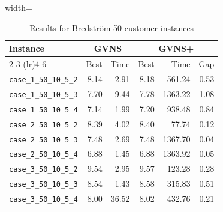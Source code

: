 \documentclass{article}
\begin{document}
\begin{table}[ht]
\centering
\small
\setlength{\tabcolsep}{3pt}
\caption{Results for Bredström 50-customer instances}
\vspace{4mm}
\begin{adjustbox}{width=\textwidth}
\begin{tabular}{l r r @{\hspace{4pt}} r r r}
\toprule
\multirow{2}{*}{Instance} & \multicolumn{2}{c}{GVNS} & \multicolumn{3}{c}{GVNS+} \\
\cmidrule(lr){2-3} \cmidrule(lr){4-6}
 & Best & Time & Best & Time & Gap \\
\midrule
\texttt{case\_1\_50\_10\_5\_2} & 8.14 & 2.91 & 8.18 & 561.24 & 0.53 \\
\texttt{case\_1\_50\_10\_5\_3} & 7.70 & 9.44 & 7.78 & 1363.22 & 1.08 \\
\texttt{case\_1\_50\_10\_5\_4} & 7.14 & 1.99 & 7.20 & 938.48 & 0.84 \\
\texttt{case\_2\_50\_10\_5\_2} & 8.39 & 4.02 & 8.40 & 77.74 & 0.12 \\
\texttt{case\_2\_50\_10\_5\_3} & 7.48 & 2.69 & 7.48 & 1367.70 & 0.04 \\
\texttt{case\_2\_50\_10\_5\_4} & 6.88 & 1.45 & 6.88 & 1363.92 & 0.05 \\
\texttt{case\_3\_50\_10\_5\_2} & 9.54 & 2.95 & 9.57 & 123.28 & 0.28 \\
\texttt{case\_3\_50\_10\_5\_3} & 8.54 & 1.43 & 8.58 & 315.83 & 0.51 \\
\texttt{case\_3\_50\_10\_5\_4} & 8.00 & 36.52 & 8.02 & 432.76 & 0.21 \\
\bottomrule
\end{tabular}
\end{adjustbox}
\end{table}
\end{document}
